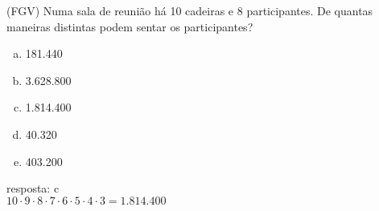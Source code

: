 \begin{ex}
 (FGV) Numa sala de reunião há 10 cadeiras e 8 participantes.  De quantas maneiras distintas podem sentar os participantes?
    \begin{enumerate}[(a)]
    \item 181.440
    \item 3.628.800
    \item 1.814.400
    \item 40.320
    \item 403.200
    \end{enumerate}
       \begin{sol}
        resposta: c \\
        $10\cdot9\cdot8\cdot7\cdot6\cdot5\cdot4\cdot3=1.814.400$
       \end{sol}
\end{ex}